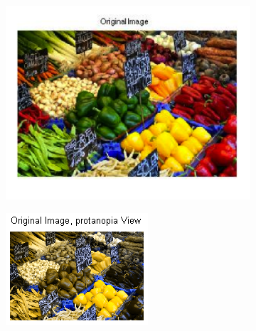 \documentclass[10pt,twocolumn,letterpaper]{article}
\begin{document}
\begin{figure}[h]
  \centering
  \begin{subfigure}{0.23\textwidth}
    \includegraphics[width=\textwidth]{peppers2.png}
    \caption{}
  \end{subfigure}
  \begin{subfigure}{0.23\textwidth}
    \includegraphics[width=\textwidth]{peppers_original_sim.png}
    \caption{}
  \end{subfigure}
  \begin{subfigure}{0.23\textwidth}

\end{subfigure}
\end{figure}
\end{document}
